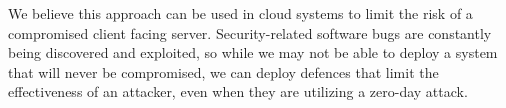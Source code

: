 \documentclass[a4paper,twoside]{article}
\begin{document}
We believe this approach can be used in cloud systems to limit the risk of a compromised client facing server.  Security-related software bugs are constantly being discovered and exploited, so while we may not be able to deploy a system that will never be compromised, we can deploy defences that limit the effectiveness of an attacker, even when they are utilizing a zero-day attack.





%
%
\end{document}
